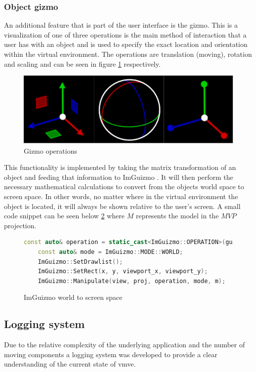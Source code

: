 \documentclass[11pt]{article}
\begin{document}
\subsubsection{Object gizmo}
An additional feature that is part of the user interface is the gizmo. This is a
visualization of one of three operations is the main method of interaction that
a user has with an object and is used to specify the exact location and
orientation within the virtual environment. The operations are translation
(moving), rotation and scaling and can be seen in figure \ref{fig:gizmo}
respectively.
\begin{figure}[H]
  \centering
  \includegraphics[width=\textwidth]{images/gizmo.png}
  \caption{Gizmo operations}
  \label{fig:gizmo}
\end{figure}

This functionality is implemented by taking the matrix transformation of an
object and feeding that information to ImGuizmo \cite{imguizmo}. It will then
perform the necessary mathematical calculations to convert from the objects
world space to screen space. In other words, no matter where in the virtual
environment the object is located, it will always be shown relative to the user's
screen. A small code snippet can be seen below \ref{fig:imguizmo_code} where
\(M\) represents the model in the \(MVP\) projection.


\begin{figure}[H]
  \centering
  \begin{lstlisting}[language=C++]
    const auto& operation = static_cast<ImGuizmo::OPERATION>(guizmo_operation);
    const auto& mode = ImGuizmo::MODE::WORLD;
    ImGuizmo::SetDrawlist();
    ImGuizmo::SetRect(x, y, viewport_x, viewport_y);
    ImGuizmo::Manipulate(view, proj, operation, mode, m);
  \end{lstlisting}
  \caption{ImGuizmo world to screen space}
  \label{fig:imguizmo_code}
\end{figure}

\subsection{Logging system}
Due to the relative complexity of the underlying application and the number of
moving components a logging system was developed to provide a clear
understanding of the current state of \gls*{vmve}. 
\end{document}
